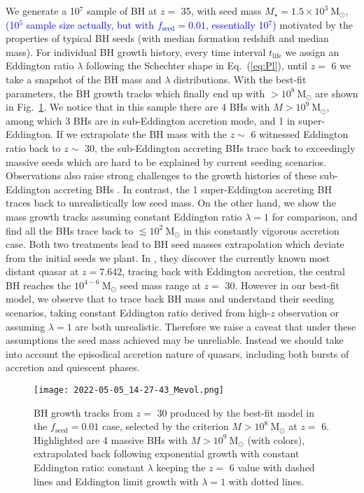 \documentclass[nolinenumbers,preprint2,tighten]{aastex631}
\newcommand{\Msun}{\mathrm{M_\odot}}
\newcommand{\tlife}{t_\mathrm{life}}
\newcommand{\fseed}{f_\mathrm{seed}}
\newcommand{\blue}[1]{\textcolor{blue}{ #1}}
\begin{document}
\begin{CJK*}{UTF8}{gbsn}
We generate a 10$^7$ sample of BH at $z=$ 35, with seed mass $M_\star = 1.5\times 10^3~\Msun$, 
\blue{(10$^5$ sample size actually, but with $\fseed=0.01$, essentially 10$^7$)}
motivated by the properties of typical BH seeds (with median formation redshift and median mass).
For individual BH growth history, every time interval $\tlife$ we assign an Eddington ratio 
$\lambda$ following the Schechter shape in Eq.~(\ref{eq:Pl}), 
until $z=$ 6 we take a snapshot of the BH mass and $\lambda$ distributions.
With the best-fit parameters, the BH growth tracks which finally end up with $>10^8~\Msun$ 
are shown in Fig.~\ref{fig:track}. 
We notice that in this sample there are 4 BHs with $M>10^9~\Msun$, 
among which 3 BHs are in sub-Eddington accretion mode, and 1 in super-Eddington. 
If we extrapolate the BH mass with the $z \sim$ 6 witnessed Eddington ratio back to $z\sim$ 30, 
the sub-Eddington accreting BHs trace back to exceedingly massive seeds which are hard to be explained by current seeding scenarios. 
Observations also raise strong challenges to the growth histories of these sub-Eddington accreting BHs
\citep[e.g.,][]{2019ApJ...880...77O}.
In contrast, the 1 super-Eddington accreting BH traces back to unrealistically low seed mass. 
On the other hand, we show the mass growth tracks assuming constant Eddington ratio $\lambda=1$ for comparison, 
and find all the BHs trace back to $\lesssim 10^2~\Msun$ in this constantly vigorous accretion case. 
Both two treatments lead to BH seed masses extrapolation which deviate from the initial seeds we plant. 
In \citet{2021ApJ...907L...1W}, they discover the currently known most distant quasar at $z=7.642$, 
tracing back with Eddington accretion, the central BH reaches the $10^{4-6}~\Msun$ seed mass range at $z=$ 30. 
However in our best-fit model, we observe that to trace back BH mass and understand their seeding scenarios, 
taking constant Eddington ratio derived from high-$z$ observation or assuming $\lambda=1$ are both unrealistic. 
Therefore we raise a caveat that under these assumptions the seed mass achieved may be unreliable. 
Instead we should take into account the episodical accretion nature of quasars, 
including both bursts of accretion and quiescent phases.

\begin{figure}
\centering
\texttt{[image: 2022-05-05\_14-27-43\_Mevol.png]}
\caption{
BH growth tracks from $z=$ 30 produced by the best-fit model in the $\fseed=0.01$ case, 
selected by the criterion $M>10^8~\Msun$ at $z=$ 6. 
Highlighted are 4 massive BHs with $M>10^9~\Msun$ (with colors), 
extrapolated back following exponential growth with constant Eddington ratio: 
constant $\lambda$ keeping the $z=$ 6 value with dashed lines and 
Eddington limit growth with $\lambda=1$ with dotted lines.
}
\label{fig:track}
\end{figure}


\end{CJK*}
\end{document}
